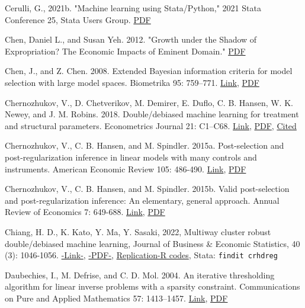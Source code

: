 {Cerulli, G., 2021b. "Machine learning using Stata/Python," 2021 Stata Conference 25, Stata Users Group. \href{https://arxiv.org/pdf/2103.03122.pdf}{PDF}

Chen, Daniel L., and Susan Yeh. 2012. "Growth under the Shadow of Expropriation? The Economic Impacts of Eminent Domain." \href{http:// www.sole-jole.org/13463.pdf}{PDF}

Chen, J., and Z. Chen. 2008. Extended Bayesian information criteria for model selection
with large model spaces. Biometrika 95: 759–771. \href{https://doi.org/10.1093/biomet/asn034}{Link}, \href{http://sci-hub.ren/10.1093/biomet/asn034}{PDF}

Chernozhukov, V., D. Chetverikov, M. Demirer, E. Duflo, C. B. Hansen, W. K. Newey, and J. M. Robins. 2018.
Double/debiased machine learning for treatment and structural parameters. Econometrics Journal 21: C1–C68.
\href{https://doi.org/10.1111/ectj.12097}{Link}, \href{http://sci-hub.ren/10.1111/ectj.12097}{PDF}, \href{https://xs2.dailyheadlines.cc/scholar?cites=17289873169606420768&as_sdt=2005&sciodt=0,5&hl=zh-CN}{Cited}

Chernozhukov, V., C. B. Hansen, and M. Spindler. 2015a. 
Post-selection and post-regularization inference in linear models with many controls and instruments. American Economic Review 105: 486-490. 
\href{https://doi.org/10.1257/aer.p20151022}{Link}, \href{http://sci-hub.ren/10.1257/aer.p20151022}{PDF}

Chernozhukov, V., C. B. Hansen, and M. Spindler. 
2015b. Valid post-selection and post-regularization inference: An elementary, general approach. Annual Review of Economics 7: 649-688. \href{https://doi.org/10.1146/annurev-economics-012315-015826}{Link}, \href{http://sci-hub.ren/10.1146/annurev-economics-012315-015826}{PDF}


Chiang, H. D., K. Kato, Y. Ma, Y. Sasaki, 2022, Multiway cluster robust double/debiased machine learning, Journal of Business \& Economic Statistics, 40 (3): 1046-1056. \href{https://doi.org/10.1080/07350015.2021.1895815}{-Link-}, \href{https://sci-hub.ren/10.1080/07350015.2021.1895815}{-PDF-}, \href{https://www.tandfonline.com/doi/suppl/10.1080/07350015.2021.1895815?scroll=top}{Replication-R codes}, Stata: \texttt{findit crhdreg}

Daubechies, I., M. Defrise, and C. D. Mol. 2004. An iterative thresholding algorithm for linear inverse
problems with a sparsity constraint. Communications on Pure and Applied Mathematics 57: 1413–1457.
\href{https://doi.org/10.1002/cpa.20042}{Link}, \href{http://sci-hub.ren/10.1002/cpa.20042}{PDF}

}
